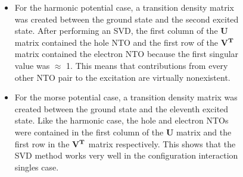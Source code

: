 \documentclass[20pt,margin=1in,innermargin=-4.5in,blockverticalspace=-0.25in]{tikzposter}
\begin{document}
\begin{columns}
{\begin{figure}[H]
\begin{subfigure}
      \end{subfigure}
    \end{figure}
    \begin{itemize}
      \item For the harmonic potential case, a transition density matrix was created between the ground state and the second excited state. After performing an SVD, the first column of the \textbf{U} matrix contained the hole NTO and the first row of the \textbf{V}$^{\text{\textbf{T}}}$ matrix contained the electron NTO because the first singular value was $\approx$ 1. This means that contributions from every other NTO pair to the excitation are virtually nonexistent.
      \item For the morse potential case, a transition density matrix was created between the ground state and the eleventh excited state. Like the harmonic case, the hole and electron NTOs were contained in the first column of the \textbf{U} matrix and the first row in the \textbf{V}$^{\text{\textbf{T}}}$ matrix respectively. This shows that the SVD method works very well in the configuration interaction singles case.
    \end{itemize}
    }


\end{columns}
\end{document}
